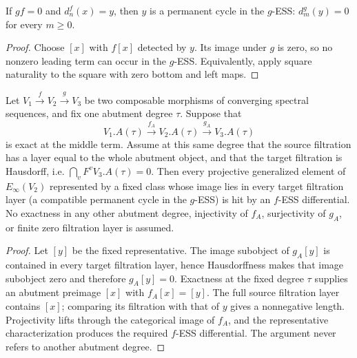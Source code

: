 \begin{corollary}
  \label{cor:fess-zero-composite-permanent}
  \notready
  If $gf=0$ and $d_n^f(x)=y$, then $y$ is a permanent cycle in the $g$-ESS:
  $d_m^g(y)=0$ for every $m\ge0$.
\end{corollary}

\begin{proof}
  Choose $[x]$ with $f[x]$ detected by $y$.  Its image under $g$ is zero, so
  no nonzero leading term can occur in the $g$-ESS.  Equivalently, apply square
  naturality to the square with zero bottom and left maps.
\end{proof}

\begin{proposition}
  \label{prop:fess-exact-middle-boundary}
  \notready
  Let $V_1\xrightarrow{f}V_2\xrightarrow{g}V_3$ be two composable morphisms of
  converging spectral sequences, and fix one abutment degree $\tau$.  Suppose
  that
  \[
    V_1.A(\tau)\xrightarrow{f_A}V_2.A(\tau)
      \xrightarrow{g_A}V_3.A(\tau)
  \]
  is exact at the middle term.  Assume at this same degree that the source
  filtration has a layer equal to the whole abutment object, and that the
  target filtration is Hausdorff, i.e.
  $\bigcap_v F^vV_3.A(\tau)=0$.  Then every projective generalized element of
  $E_\infty(V_2)$ represented by a fixed class whose image lies in every
  target filtration layer (a compatible permanent cycle in the $g$-ESS) is
  hit by an $f$-ESS differential.  No exactness in any other abutment degree,
  injectivity of $f_A$, surjectivity of $g_A$, or finite zero filtration layer
  is assumed.
\end{proposition}

\begin{proof}
  Let $[y]$ be the fixed representative.  The image subobject of $g_A[y]$ is
  contained in every target filtration layer, hence Hausdorffness makes that
  image subobject zero and therefore $g_A[y]=0$.  Exactness at the fixed degree
  $\tau$ supplies an abutment preimage $[x]$ with $f_A[x]=[y]$.  The full
  source filtration layer contains $[x]$; comparing its filtration with that
  of $y$ gives a nonnegative length.  Projectivity lifts through the
  categorical image of $f_A$, and the representative characterization
  produces the required $f$-ESS differential.  The argument never refers to
  another abutment degree.
\end{proof}

